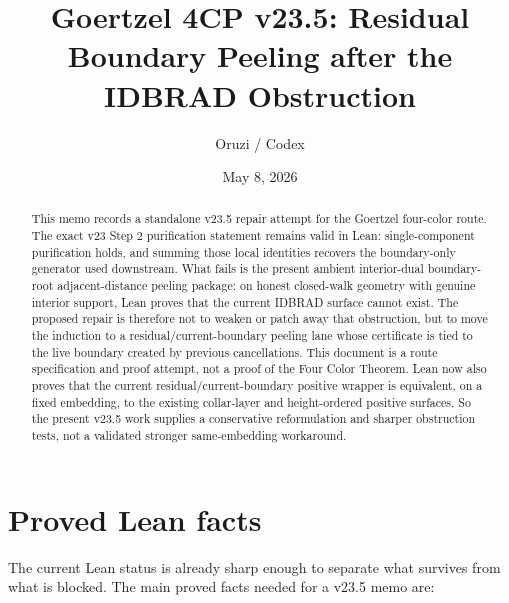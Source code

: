 \documentclass[11pt]{article}
\title{Goertzel 4CP v23.5: Residual Boundary Peeling after the IDBRAD Obstruction}
\author{Oruzi / Codex}
\date{May 8, 2026}
\begin{document}
\maketitle
\sloppy

\begin{abstract}
This memo records a standalone v23.5 repair attempt for the Goertzel four-color
route.  The exact v23 Step 2 purification statement remains valid in Lean:
single-component purification holds, and summing those local identities
recovers the boundary-only generator used downstream.  What fails is the
present ambient interior-dual boundary-root adjacent-distance peeling package:
on honest closed-walk geometry with genuine interior support, Lean proves that
the current IDBRAD surface cannot exist.  The proposed repair is therefore not
to weaken or patch away that obstruction, but to move the induction to a
residual/current-boundary peeling lane whose certificate is tied to the live
boundary created by previous cancellations.  This document is a route
specification and proof attempt, not a proof of the Four Color Theorem.  Lean
now also proves that the current residual/current-boundary positive wrapper is
equivalent, on a fixed embedding, to the existing collar-layer and
height-ordered positive surfaces.  So the present v23.5 work supplies a
conservative reformulation and sharper obstruction tests, not a validated
stronger same-embedding workaround.
\end{abstract}

\section{Proved Lean facts}

The current Lean status is already sharp enough to separate what survives from
what is blocked.  The main proved facts needed for a v23.5 memo are:
\end{document}
